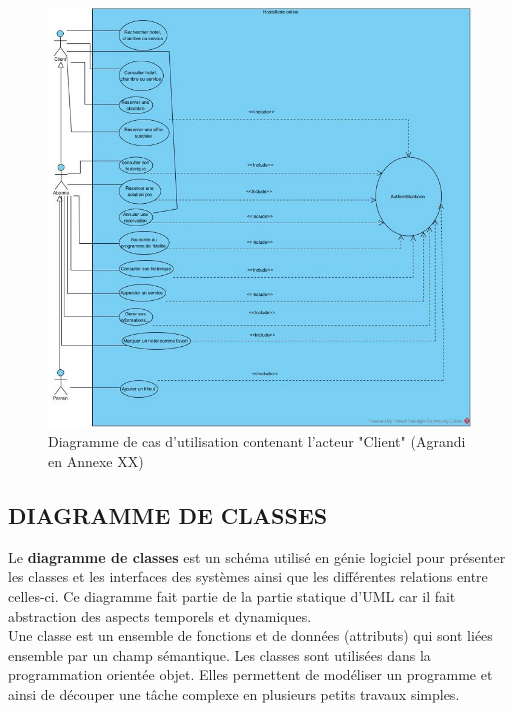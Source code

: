 \begin{figure}[!htbp]
	\begin{center}
		\includegraphics[scale=0.85]{images/diag_use_case1.jpg}
		\caption{Diagramme de cas d'utilisation contenant l'acteur "Client" (Agrandi en Annexe XX)}
		\label{use_case_diagramme_two}
	\end{center}
\end{figure}
\cleardoublepage
\subsection{DIAGRAMME DE CLASSES}

Le \textbf{diagramme de classes} est un schéma utilisé en génie logiciel pour présenter les classes et les interfaces des systèmes ainsi que les différentes relations entre celles-ci. Ce diagramme fait partie de la partie statique d'UML car il fait abstraction des aspects temporels et dynamiques.\\
Une classe est un ensemble de fonctions et de données (attributs) qui sont liées ensemble par un champ sémantique. Les classes sont utilisées dans la programmation orientée objet. Elles permettent de modéliser un programme et ainsi de découper une tâche complexe en plusieurs petits travaux simples.\\

